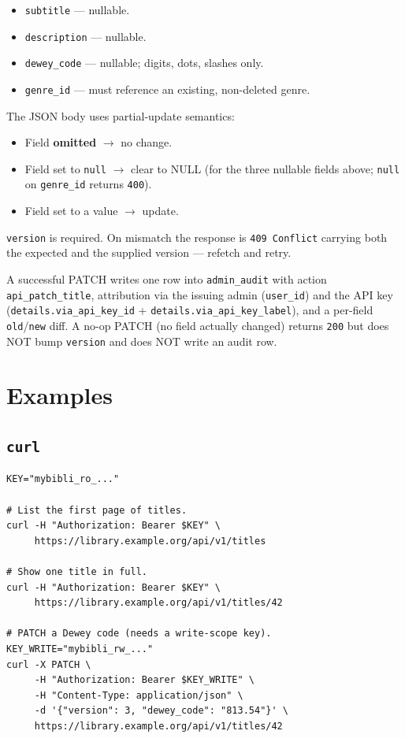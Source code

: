 \begin{itemize}
  \item \texttt{subtitle} — nullable.
  \item \texttt{description} — nullable.
  \item \texttt{dewey\_code} — nullable; digits, dots, slashes only.
  \item \texttt{genre\_id} — must reference an existing,
        non-deleted genre.
\end{itemize}

The JSON body uses partial-update semantics:

\begin{itemize}
  \item Field \textbf{omitted} \(\rightarrow\) no change.
  \item Field set to \texttt{null} \(\rightarrow\) clear to
        NULL (for the three nullable fields above; \texttt{null}
        on \texttt{genre\_id} returns \texttt{400}).
  \item Field set to a value \(\rightarrow\) update.
\end{itemize}

\texttt{version} is required. On mismatch the response is
\texttt{409 Conflict} carrying both the expected and the
supplied version — refetch and retry.

A successful PATCH writes one row into \texttt{admin\_audit}
with action \texttt{api\_patch\_title}, attribution via the
issuing admin (\texttt{user\_id}) and the API key
(\texttt{details.via\_api\_key\_id} +
\texttt{details.via\_api\_key\_label}), and a per-field
\texttt{old}/\texttt{new} diff. A no-op PATCH (no field
actually changed) returns \texttt{200} but does NOT bump
\texttt{version} and does NOT write an audit row.

\section{Examples}

\subsection{\texttt{curl}}

\begin{verbatim}
KEY="mybibli_ro_..."

# List the first page of titles.
curl -H "Authorization: Bearer $KEY" \
     https://library.example.org/api/v1/titles

# Show one title in full.
curl -H "Authorization: Bearer $KEY" \
     https://library.example.org/api/v1/titles/42

# PATCH a Dewey code (needs a write-scope key).
KEY_WRITE="mybibli_rw_..."
curl -X PATCH \
     -H "Authorization: Bearer $KEY_WRITE" \
     -H "Content-Type: application/json" \
     -d '{"version": 3, "dewey_code": "813.54"}' \
     https://library.example.org/api/v1/titles/42
\end{verbatim}

